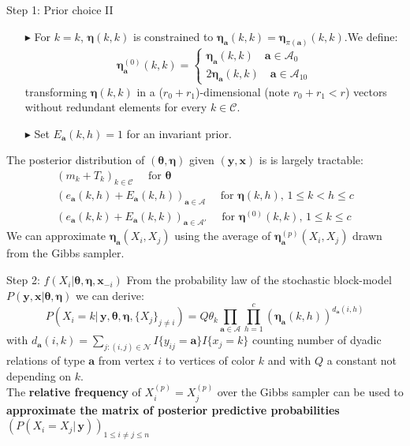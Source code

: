 \documentclass[aspectratio=169,xcolor=dvipsnames]{beamer}
\newcommand{\veca}{\boldsymbol{a}}
\newcommand{\setn}{\mathcal{N}}
\newcommand{\seta}{\mathcal{A}}
\newcommand{\setc}{\mathcal{C}}
\newcommand{\vecx}{\textbf{x}}
\newcommand{\vecy}{\textbf{y}}
\newcommand{\veceta}{\boldsymbol{\eta}}
\newcommand{\vectheta}{\boldsymbol{\theta}}
\begin{document}
\begin{frame}{Step 1: Prior choice II}
\begin{itemize}
        \addtolength{\itemindent}{12pt}
        \item[$\blacktriangleright$] For $k=k$, $\veceta(k,k)$ is constrained to $\veceta_{\veca}(k,k) = \veceta_{\pi(\veca)}(k,k)$.\pause We  define:
        $$
        \veceta^{(0)}_{\veca}(k,k) =
        \begin{cases} 
        \veceta_{\veca}(k,k) \quad \veca \in \seta_0 \\
        2\veceta_{\veca}(k,k) \quad \veca \in \seta_{10}
        \end{cases}
        $$
        transforming $\veceta(k,k)$ in a ($r_0+r_1$)-dimensional (note $r_0+r_1<r$) vectors without redundant elements for every $k \in \setc$.

        \pause 
        \item[$\blacktriangleright$] Set $E_{\veca}(k,h)=1$ for an invariant prior. \pause
\end{itemize}
The posterior distribution of $(\vectheta, \veceta)$ given $(\vecy, \vecx)$ is  is largely tractable:
\begin{gather*}
    (m_k + T_k)_{k \in \setc} \quad \text{ for } \vectheta \\
    (e_{\veca}(k,h) + E_{\veca}(k,h))_{\veca \in \seta } \quad \text{ for } \veceta(k,h), \, 1\leq k < h \leq c \\
    (e_{\veca}(k,k) + E_{\veca}(k,k))_{\veca \in \seta'} \quad \text{ for } \veceta^{(0)}(k,k), \, 1\leq k\leq c
\end{gather*}
\pause
We can approximate $\veceta_{\veca}(X_i,X_j)$ using the average of $\veceta^{(p)}_{\veca}(X_i,X_j)$ drawn from the Gibbs sampler.
    
\end{frame}
\begin{frame}{Step 2: $f(X_i| \vectheta, \veceta, \vecx_{-i})$}
From the probability law of the stochastic block-model $P(\vecy, \vecx | \vectheta, \veceta) $ we can derive:
$$
P(X_i = k|\, \vecy, \vectheta, \veceta, \{X_j\}_{j\neq i})= Q\theta_k\prod_{\veca\in\seta}\prod_{h=1}^c (\veceta_{\veca}(k, h))^{d_{\veca}(i, h)}
$$
with $d_{\veca}(i, k) = \sum_{j:(i,j)\in\setn} I\{y_{ij} = \veca\}I\{x_j=k\}$  counting number of dyadic relations of type $\veca$ from vertex $i$ to vertices of color $k$ and with $Q$ a constant not depending on $k$.\\ \pause
\vspace{15pt}
The \textbf{relative frequency} of $X^{(p)}_i=X^{(p)}_j$ over the Gibbs sampler can be used to \textbf{approximate the matrix of posterior predictive probabilities} $ (P(X_i=X_j | \, \vecy))_{1\leq i \neq j \leq n}$
\vspace{30pt}
\end{frame}
\end{document}
